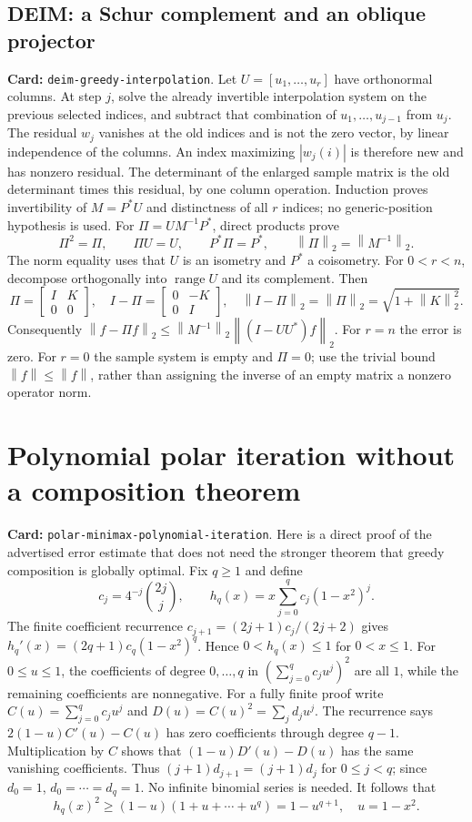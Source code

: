 \documentclass[11pt,a4paper]{article}
\newcommand{\norm}[1]{\left\lVert#1\right\rVert}
\DeclareRobustCommand{\code}[1]{{\footnotesize\urlstyle{tt}\nolinkurl{#1}}}
\begin{document}
\subsection{DEIM: a Schur complement and an oblique projector}
\label{route:deim-greedy-interpolation}
\textbf{Card:} \code{deim-greedy-interpolation}.
Let $U=[u_1,\ldots,u_r]$ have orthonormal columns. At step $j$, solve the
already invertible interpolation system on the previous selected indices,
and subtract that combination of $u_1,\ldots,u_{j-1}$ from $u_j$.
The residual $w_j$ vanishes at the old indices and is not the zero vector,
by linear independence of the columns. An index maximizing $|w_j(i)|$
is therefore new and has nonzero residual. The determinant of the enlarged
sample matrix is the old determinant times this residual, by one column
operation. Induction proves invertibility of $M=P^*U$ and distinctness of
all $r$ indices; no generic-position hypothesis is used.
For $\Pi=UM^{-1}P^*$, direct products prove
\[
 \Pi^2=\Pi,\qquad \Pi U=U,\qquad P^*\Pi=P^*,\qquad
 \norm\Pi_2=\norm{M^{-1}}_2.
\]
The norm equality uses that $U$ is an isometry and $P^*$ a coisometry.
For $0<r<n$, decompose orthogonally into $\operatorname{range}U$ and its
complement. Then
\[
 \Pi=\begin{bmatrix}I&K\\0&0\end{bmatrix},\quad
 I-\Pi=\begin{bmatrix}0&-K\\0&I\end{bmatrix},\quad
 \norm{I-\Pi}_2=\norm\Pi_2=\sqrt{1+\norm K_2^2}.
\]
Consequently
$\norm{f-\Pi f}_2\le\norm{M^{-1}}_2\norm{(I-UU^*)f}_2$.
For $r=n$ the error is zero. For $r=0$ the sample system is empty and
$\Pi=0$; use the trivial bound $\norm f\le\norm f$, rather than assigning
the inverse of an empty matrix a nonzero operator norm.

\section{Polynomial polar iteration without a composition theorem}
\label{route:polar-minimax-polynomial-iteration}
\textbf{Card:} \code{polar-minimax-polynomial-iteration}.
Here is a direct proof of the advertised error estimate that does not need
the stronger theorem that greedy composition is globally optimal.
Fix $q\ge1$ and define
\[
 c_j=4^{-j}\binom{2j}{j},\qquad
 h_q(x)=x\sum_{j=0}^qc_j(1-x^2)^j.
\]
The finite coefficient recurrence $c_{j+1}=(2j+1)c_j/(2j+2)$ gives
$h_q'(x)=(2q+1)c_q(1-x^2)^q$. Hence $0<h_q(x)\le1$ for $0<x\le1$.
For $0\le u\le1$, the coefficients of degree $0,\ldots,q$ in
$(\sum_{j=0}^qc_ju^j)^2$ are all $1$, while the remaining coefficients
are nonnegative. For a fully finite proof write $C(u)=\sum_{j=0}^qc_ju^j$
and $D(u)=C(u)^2=\sum_jd_ju^j$. The recurrence says
$2(1-u)C'(u)-C(u)$ has zero coefficients through degree $q-1$.
Multiplication by $C$ shows that $(1-u)D'(u)-D(u)$ has the same
vanishing coefficients. Thus
$(j+1)d_{j+1}=(j+1)d_j$ for $0\le j<q$; since $d_0=1$,
$d_0=\cdots=d_q=1$. No infinite binomial series is needed.
It follows that
\[
 h_q(x)^2\ge(1-u)(1+u+\cdots+u^q)=1-u^{q+1},\quad u=1-x^2. \tag{P1}
\]
\end{document}
